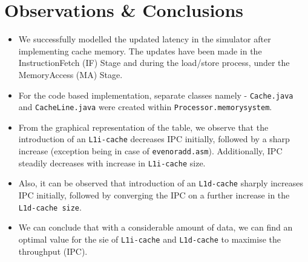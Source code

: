 \documentclass{article}
\begin{document}
\section{Observations \& Conclusions}
\begin{itemize}
    \item We successfully modelled the updated latency in the simulator after implementing cache memory. The updates have been made in the InstructionFetch (IF) Stage and during the load/store process, under the MemoryAccess (MA) Stage. 
    \item For the code based implementation, separate classes namely - \texttt{Cache.java} and \texttt{CacheLine.java} were created within \texttt{Processor.memorysystem}.
    \item From the graphical representation of the table, we observe that the introduction of an \texttt{L1i-cache} decreases IPC initially, followed by a sharp increase (exception being in case of \texttt{evenoradd.asm}). Additionally, IPC steadily decreases with increase in \texttt{L1i-cache} size.
    \item Also, it can be observed that introduction of an \texttt{L1d-cache} sharply increases IPC initially, followed by converging the IPC on a further increase in the \texttt{L1d-cache size}.
    \item We can conclude that with a considerable amount of data, we can find an optimal value for the sie of \texttt{L1i-cache} and \texttt{L1d-cache} to maximise the throughput (IPC).
\end{itemize}

\newpage

\appendix
\end{document}
